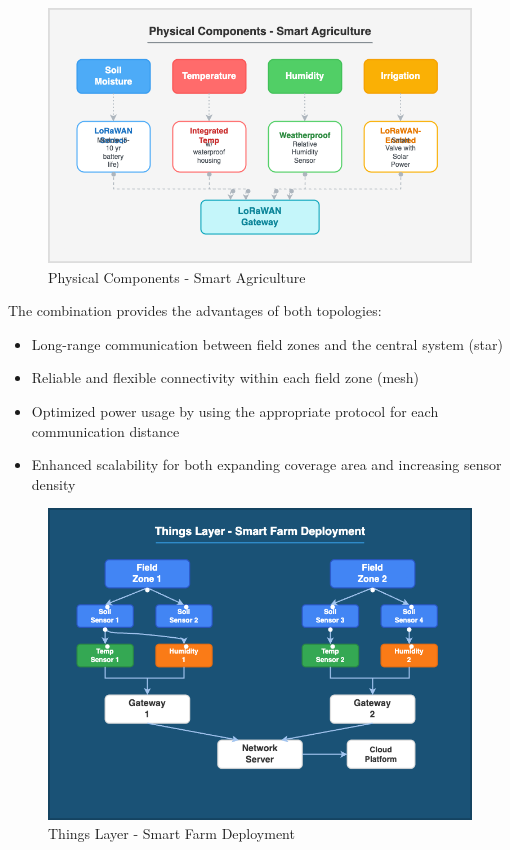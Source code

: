 \documentclass[12pt,a4paper]{article}
\begin{document}
\begin{figure}[H]
\centering
\includegraphics[width=\textwidth]{img/drawio/Physical_Components.png}
\caption{Physical Components - Smart Agriculture}
\label{fig:physical_components}
\end{figure}

The combination provides the advantages of both topologies:

\begin{itemize}
    \item Long-range communication between field zones and the central system (star)
    \item Reliable and flexible connectivity within each field zone (mesh)
    \item Optimized power usage by using the appropriate protocol for each communication distance
    \item Enhanced scalability for both expanding coverage area and increasing sensor density
\end{itemize}

\begin{figure}[H]
\centering
\includegraphics[width=\textwidth]{img/drawio/Things_Layer.png}
\caption{Things Layer - Smart Farm Deployment}
\label{fig:things_layer}
\end{figure}
\end{document}

